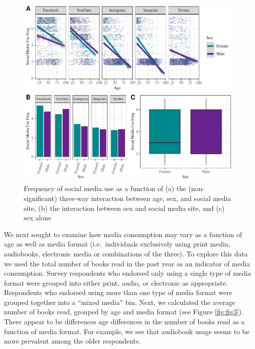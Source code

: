 \documentclass[man, fleqn, noextraspace]{apa6}
\theoremstyle{definition}
\theoremstyle{definition}
\theoremstyle{definition}
\theoremstyle{remark}
\begin{document}
\begin{figure}
\centering
\includegraphics{final_manuscript_files/figure-latex/fig2-1.pdf}
\caption{\label{fig:fig2}Frequency of social media use as a function of (a)
the (non-significant) three-way interaction between age, sex, and social
media site, (b) the interaction between sex and social media site, and
(c) sex alone}
\end{figure}

We next sought to examine how media consumption may vary as a function
of age as well as media format (i.e.~individuals exclusively using print
media, audiobooks, electronic media or combinations of the three). To
explore this data we used the total number of books read in the past
year as an indicator of media consumption. Survey respondents who
endorsed only using a single type of media format were grouped into
either print, audio, or electronic as appropriate. Respondents who
endorsed using more than one type of media format were grouped together
into a \enquote{mixed media} bin. Next, we calculated the average number
of books read, grouped by age and media format (see Figure
\ref{fig:fig3}). There appear to be differences age differences in the
number of books read as a function of media format. For example, we see
that audiobook usage seems to be more prevalent among the older
respondents.
\end{document}
